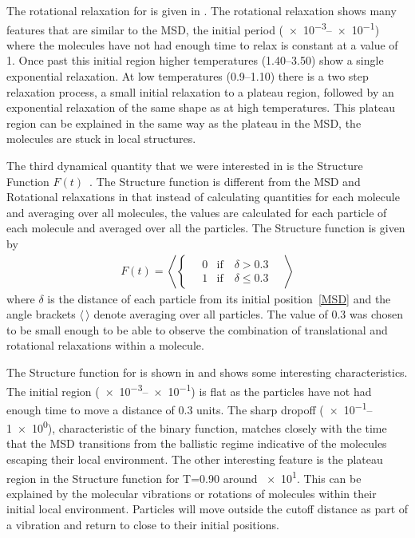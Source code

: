 The rotational relaxation for \sone is given in . The rotational relaxation shows many features that are similar to the MSD, the initial period (\numrange{e-3}{e-1}) where the molecules have not had enough time to relax is constant at a value of \num{1}. Once past this initial region higher temperatures (\numrange{1.40}{3.50}) show a single exponential relaxation. At low temperatures (\numrange{0.9}{1.10}) there is a two step relaxation process, a small initial relaxation to a plateau region, followed by an exponential relaxation of the same shape as at high temperatures. This plateau region can be explained in the same way as the plateau in the MSD, the molecules are stuck in local structures.

The third dynamical quantity that we were interested in is the Structure Function $F(t)$~. The Structure function is different from the MSD and Rotational relaxations in that instead of calculating quantities for each molecule and averaging over all molecules, the values are calculated for each particle of each molecule and averaged over all the particles. The Structure function is given by
\begin{align}
    F(t) = \left \langle \begin{cases}
        \quad0 &\text{if}\quad \delta > 0.3 \\
        \quad1 &\text{if}\quad \delta \leq 0.3
    \end{cases} \quad \right \rangle
    \label{eq:struct}
\end{align}
where $\delta$ is the distance of each particle from its initial position~\eqref{MSD} and the angle brackets $\langle\,\rangle$ denote averaging over all particles. The value of \num{0.3} was chosen to be small enough to be able to observe the combination of translational and rotational relaxations within a molecule.

The Structure function for \sone is shown in  and shows some interesting characteristics. The initial region (\numrange{e-3}{e-1}) is flat as the particles have not had enough time to move a distance of \num{0.3} units. The sharp dropoff (\numrange{e-1}{1e0}), characteristic of the binary function, matches closely with the time that the MSD transitions from the ballistic regime indicative of the molecules escaping their local environment. The other interesting feature is the plateau region in the Structure function for T=0.90 around \num{e1}. This can be explained by the molecular vibrations or rotations of molecules within their initial local environment. Particles will move outside the cutoff distance as part of a vibration and return to close to their initial positions.

